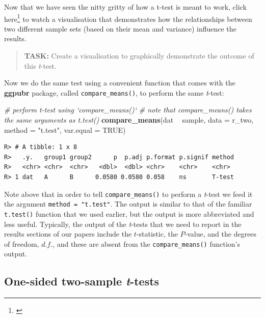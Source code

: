 \documentclass[english,10pt,a4paper,oneside]{book}
\renewcommand{\href}[2]{#2\footnote{\url{#1}}}
\let\rmarkdownfootnote\footnote%
\def\footnote{\protect\rmarkdownfootnote}
\newenvironment{Shaded}{\begin{snugshade}}{\end{snugshade}}
\newcommand{\CommentTok}[1]{\textcolor[rgb]{0.56,0.35,0.01}{\textit{#1}}}
\newcommand{\DataTypeTok}[1]{\textcolor[rgb]{0.13,0.29,0.53}{#1}}
\newcommand{\KeywordTok}[1]{\textcolor[rgb]{0.13,0.29,0.53}{\textbf{#1}}}
\newcommand{\NormalTok}[1]{#1}
\newcommand{\OperatorTok}[1]{\textcolor[rgb]{0.81,0.36,0.00}{\textbf{#1}}}
\newcommand{\OtherTok}[1]{\textcolor[rgb]{0.56,0.35,0.01}{#1}}
\newcommand{\StringTok}[1]{\textcolor[rgb]{0.31,0.60,0.02}{#1}}
\theoremstyle{definition}
\theoremstyle{definition}
\theoremstyle{definition}
\theoremstyle{remark}
\begin{document}
Now that we have seen the nitty gritty of how a t-test is meant to work,
click \href{}{here} to watch a visualisation that demonstrates how the
relationships between two different sample sets (based on their mean and
variance) influence the results.

\begin{quote}
\textbf{TASK:} Create a visualisation to graphically demonstrate the
outcome of this \emph{t}-test.
\end{quote}

Now we do the same test using a convenient function that comes with the
\textbf{ggpubr} package, called \texttt{compare\_means()}, to perform
the same \emph{t}-test:

\begin{Shaded}
\begin{Highlighting}[]
\CommentTok{# perform t-test using `compare_means()`}
\CommentTok{# note that compare_means() takes the same arguments as t.test()}
\KeywordTok{compare_means}\NormalTok{(dat }\OperatorTok{~}\StringTok{ }\NormalTok{sample, }\DataTypeTok{data =}\NormalTok{ r_two, }\DataTypeTok{method =} \StringTok{"t.test"}\NormalTok{, }\DataTypeTok{var.equal =} \OtherTok{TRUE}\NormalTok{)}
\end{Highlighting}
\end{Shaded}

\begin{verbatim}
R> # A tibble: 1 x 8
R>   .y.   group1 group2      p  p.adj p.format p.signif method
R>   <chr> <chr>  <chr>   <dbl>  <dbl> <chr>    <chr>    <chr> 
R> 1 dat   A      B      0.0580 0.0580 0.058    ns       T-test
\end{verbatim}

Note above that in order to tell \texttt{compare\_means()} to perform a
\emph{t}-test we feed it the argument \texttt{method\ =\ "t.test"}. The
output is similar to that of the familiar \texttt{t.test()} function
that we used earlier, but the output is more abbreviated and less
useful. Typically, the output of the \emph{t}-tests that we need to
report in the results sections of our papers include the
\(t\)-statistic, the \(P\)-value, and the degrees of freedom, \(d.f.\),
and these are absent from the \texttt{compare\_means()} function's
output.

\hypertarget{one-sided-two-sample-t-tests}{%
\subsection{\texorpdfstring{One-sided two-sample
\emph{t}-tests}{One-sided two-sample t-tests}}\label{one-sided-two-sample-t-tests}}
\end{document}
